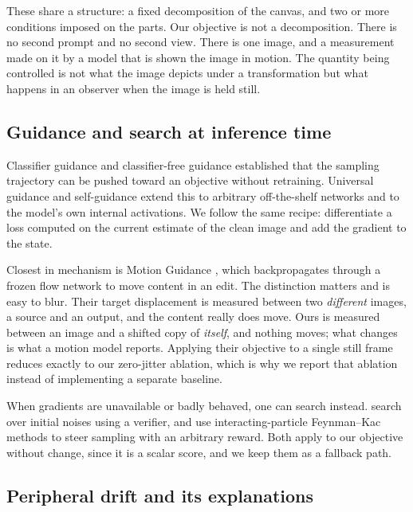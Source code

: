 These share a structure: a fixed decomposition of the canvas, and two or more
conditions imposed on the parts. Our objective is not a decomposition. There is
no second prompt and no second view. There is one image, and a measurement made
on it by a model that is shown the image in motion. The quantity being
controlled is not what the image depicts under a transformation but what
happens in an observer when the image is held still.

\subsection{Guidance and search at inference time}

Classifier guidance \cite{dhariwal2021guidance} and classifier-free guidance
\cite{ho2022cfg} established that the sampling trajectory can be pushed toward
an objective without retraining. Universal guidance \cite{bansal2023universal}
and self-guidance \cite{epstein2023selfguidance} extend this to arbitrary
off-the-shelf networks and to the model's own internal activations. We follow
the same recipe: differentiate a loss computed on the current estimate of the
clean image and add the gradient to the state.

Closest in mechanism is Motion Guidance \cite{geng2024motionguidance}, which
backpropagates through a frozen flow network \cite{teed2020raft} to move
content in an edit. The distinction matters and is easy to blur. Their target
displacement is measured between two \emph{different} images, a source and an
output, and the content really does move. Ours is measured between an image and
a shifted copy of \emph{itself}, and nothing moves; what changes is what a
motion model reports. Applying their objective to a single still frame reduces
exactly to our zero-jitter ablation, which is why we report that ablation
instead of implementing a separate baseline.

When gradients are unavailable or badly behaved, one can search instead.
\citet{ma2025inferencescaling} search over initial noises using a verifier, and
\citet{singhal2025fk} use interacting-particle Feynman--Kac methods to steer
sampling with an arbitrary reward. Both apply to our objective without change,
since it is a scalar score, and we keep them as a fallback path.

\subsection{Peripheral drift and its explanations}

